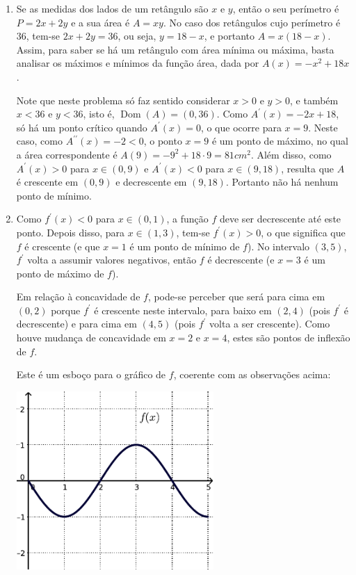 \documentclass[12pt,a4paper]{article}
\newcommand*\dom[1]{\operatorname{Dom}\left(#1\right)}
\begin{document}
\begin{enumerate}
\item
Se as medidas dos lados de um retângulo são $x$ e $y$, então o seu perímetro é $P = 2x + 2y$ e a sua área é $A = xy$. No caso dos retângulos cujo perímetro é $36$, tem-se $2x + 2y = 36$, ou seja, $y = 18-x$, e portanto $A = x(18 - x)$. Assim, para saber se há um retângulo com área mínima ou máxima, basta analisar os máximos e mínimos da função área, dada por $A(x) = -x^2 + 18x$.

Note que neste problema só faz sentido considerar $x>0$ e $y>0$, e também $x<36$ e $y<36$, isto é, $\dom{A} = (0, 36)$. Como $A^\prime(x) = -2x+18$, só há um ponto crítico quando $A^\prime(x) = 0$, o que ocorre para $x = 9$. Neste caso, como $A^{\prime \prime}(x) = -2 < 0$, o ponto $x=9$ é um ponto de máximo, no qual a área correspondente é $A(9)=-9^2+18 \cdot 9 = 81 cm^2$. Além disso, como $A^\prime(x) > 0$ para $x \in (0,9)$ e $A^\prime(x) < 0$ para $x \in (9,18)$, resulta que $A$ é crescente em $(0,9)$ e decrescente em $(9,18)$. Portanto não há nenhum ponto de mínimo.


\item Como $f^\prime(x) < 0$ para $x \in (0,1)$, a função $f$ deve ser decrescente até este ponto. Depois disso, para $x \in (1,3)$, tem-se $f^\prime(x) > 0$, o que significa que $f$ é crescente (e que $x=1$ é um ponto de mínimo de $f$). No intervalo $(3,5)$, $f^\prime$ volta a assumir valores negativos, então $f$ é decrescente (e $x=3$ é um ponto de máximo de $f$).

Em relação à concavidade de $f$, pode-se perceber que será para cima em $(0,2)$ porque $f^\prime$ é crescente neste intervalo, para baixo em $(2,4)$ (pois $f^\prime$ é decrescente) e para cima em $(4,5)$ (pois $f^\prime$ volta a ser crescente). Como houve mudança de concavidade em $x=2$ e $x=4$, estes são pontos de inflexão de $f$.

Este é um esboço para o gráfico de $f$, coerente com as observações acima:

\centering
\includegraphics[width=7.5cm]{img/prova-3-tads-derivada-malha-primitiva}
\end{enumerate}
\end{document}
